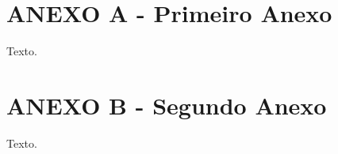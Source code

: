 \chapter*{ANEXO A - Primeiro Anexo}
\label{sec:anexoa}

Texto.


\chapter*{ANEXO B - Segundo Anexo}
\label{sec:anexob}


Texto.